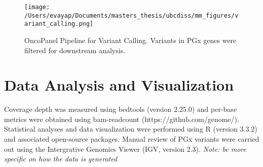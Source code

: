 \begin{figure}
    \centering
    \texttt{[image: /Users/evayap/Documents/masters\_thesis/ubcdiss/mm\_figures/variant\_calling.png]}
    \caption[
      OncoPanel Pipeline for Variant Calling.
    ]{
      OncoPanel Pipeline for Variant Calling. Variants in PGx genes were filtered for downstream analysis.
      }
    \label{fig:ccg-pipeline}   %
\end{figure}

\section{Data Analysis and Visualization}
\label{sec:DataAnalysisandVisualization}

Coverage depth was measured using bedtools (version 2.25.0) and per-base metrics were obtained using bam-readcount (https://github.com/genome/). Statistical analyses and data visualization were performed using R (version 3.3.2) and associated open-source packages. Manual review of PGx variants were carried out using the Intergrative Genomics Viewer (IGV, version 2.3). \textit{Note: be more specific on how the data is generated}

\endinput
\section{Introduction}
\label{sec:Introduction}

Genomics-driven oncology is an emerging approach that aims to use genomic information for patient management and therapeutic intervention in oncologic care. Using MPS technologies, cancer biomarkers with diagnostic, prognostic, predictive, and pharmacogenomic (PGx) significance can be screened at a reduced cost and turn-around time to inform medical decision-making. PGx markers are germline genetic

Application of genome information to guide patient management and therapeutic intervention holds great potential in improving oncology care. One of the driving forces that led to clinical feasibility of genomic sequencing is the advent of massively parallel sequencing (MPS) technologies, which enabled sensitive and accurate sequencing of more target genes with less DNA in a cost-effective and timely manner. At present, various MPS approaches are entering, or have entered the clinic such as targeted sequencing panels, whole exome sequencing, and whole genome sequencing, which create the opportunity to further develop novel clinical biomarkers in addition to screening for biomarkers with established clinical utility.

